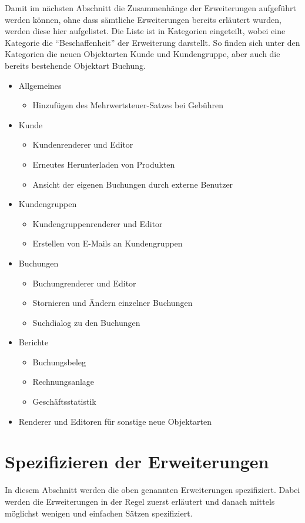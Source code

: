 Damit im nächsten Abschnitt die Zusammenhänge der Erweiterungen aufgeführt werden können, ohne dass sämtliche Erweiterungen bereits erläutert wurden, werden diese hier aufgelistet.
Die Liste ist in Kategorien eingeteilt, wobei eine Kategorie die "`Beschaffenheit"' der Erweiterung darstellt. So finden sich unter den Kategorien die neuen Objektarten Kunde und Kundengruppe, aber auch die bereits bestehende Objektart Buchung. 
\begin{itemize}
	\item Allgemeines
	\begin{itemize}
		\item Hinzufügen des Mehrwertsteuer-Satzes bei Gebühren
	\end{itemize}
	\item Kunde
	\begin{itemize}
		\item Kundenrenderer und Editor
		\item Erneutes Herunterladen von Produkten
		\item Ansicht der eigenen Buchungen durch externe Benutzer
	\end{itemize}
	\item Kundengruppen
	\begin{itemize}
		\item Kundengruppenrenderer und Editor
		\item Erstellen von E-Mails an Kundengruppen
	\end{itemize}
	\item Buchungen
	\begin{itemize}
		\item Buchungrenderer und Editor
		\item Stornieren und Ändern einzelner Buchungen
		\item Suchdialog zu den Buchungen
	\end{itemize}
	\item Berichte
	\begin{itemize}
		\item Buchungsbeleg
		\item Rechnungsanlage
		\item Geschäftsstatistik
	\end{itemize}	 
	\item Renderer und Editoren für sonstige neue Objektarten
\end{itemize}

\section{Spezifizieren der Erweiterungen}
In diesem Abschnitt werden die oben genannten Erweiterungen spezifiziert. Dabei werden die Erweiterungen in der Regel zuerst erläutert und danach mittels möglichst wenigen und einfachen Sätzen spezifiziert. 

